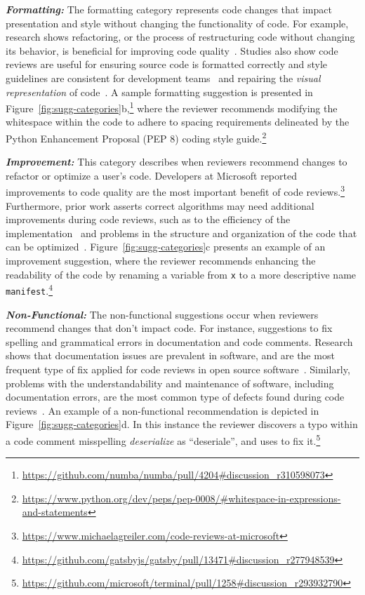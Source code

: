 \textbf{\textit{Formatting:}} The formatting category represents code changes that impact presentation and style without changing the functionality of code. For example, research shows refactoring, or the process of restructuring code without changing its behavior, is beneficial for improving code quality~\cite{stroggylos2007refactoring}. Studies also show code reviews are useful for ensuring source code is formatted correctly and style guidelines are consistent for development teams~\cite{bacchelli2013expectations} and repairing the \textit{visual representation} of code~\cite{mantyla2008types}. A sample formatting suggestion is presented in Figure~\ref{fig:sugg-categories}b,\footnote{\url{https://github.com/numba/numba/pull/4204\#discussion_r310598073}} where the reviewer recommends modifying the whitespace within the code to adhere to spacing requirements delineated by the Python Enhancement Proposal (PEP 8) coding style guide.\footnote{\url{https://www.python.org/dev/peps/pep-0008/\#whitespace-in-expressions-and-statements}}

\textbf{\textit{Improvement:}} This category describes when reviewers recommend changes to refactor or optimize a user's code. Developers at Microsoft reported improvements to code quality are the most important benefit of code reviews.\footnote{\url{https://www.michaelagreiler.com/code-reviews-at-microsoft}} Furthermore, prior work asserts correct algorithms may need additional improvements during code reviews, such as to the efficiency of the implementation~\cite{chillarege1992orthogonal} and problems in the structure and organization of the code that can be optimized~\cite{mantyla2008types}. Figure~\ref{fig:sugg-categories}c presents an example of an improvement suggestion, where the reviewer recommends enhancing the readability of the code by renaming a variable from \texttt{x} to a more descriptive name \texttt{manifest}.\footnote{\url{https://github.com/gatsbyjs/gatsby/pull/13471\#discussion_r277948539}}

\textbf{\textit{Non-Functional:}} The non-functional suggestions occur when reviewers recommend changes that don't impact code. For instance, suggestions to fix spelling and grammatical errors in documentation and code comments. Research shows that documentation issues are prevalent in software, and are the most frequent type of fix applied for code reviews in open source software~\cite{beller2014modern}. Similarly, problems with the understandability and maintenance of software, including documentation errors, are the most common type of defects found during code reviews~\cite{mantyla2008types}. An example of a non-functional recommendation is depicted in Figure~\ref{fig:sugg-categories}d. In this instance the reviewer discovers a typo within a code comment misspelling \textit{deserialize} as ``deseriale'', and uses \sugg to fix it.\footnote{\url{https://github.com/microsoft/terminal/pull/1258\#discussion_r293932790}}

